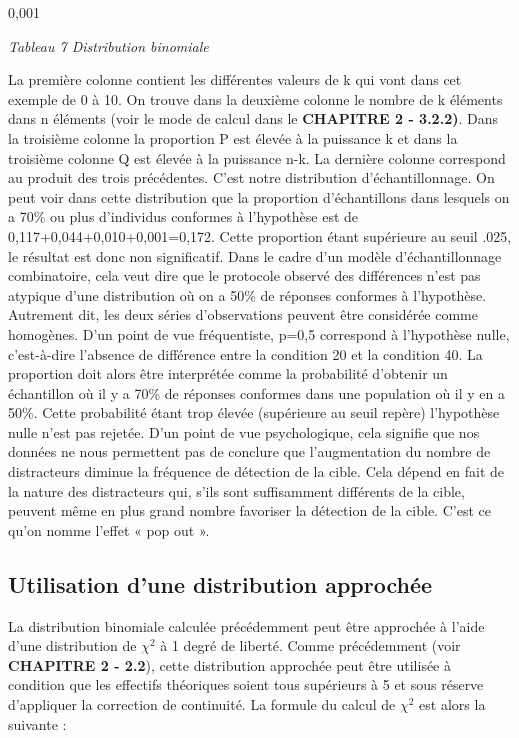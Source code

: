 \documentclass[]{book}
\theoremstyle{definition}
\theoremstyle{definition}
\theoremstyle{definition}
\theoremstyle{remark}
\begin{document}
0,001

\emph{Tableau 7 Distribution binomiale}

La première colonne contient les différentes valeurs de k qui vont dans
cet exemple de 0 à 10. On trouve dans la deuxième colonne le nombre de k
éléments dans n éléments (voir le mode de calcul dans le
\textbf{CHAPITRE 2 - 3.2.2)}. Dans la troisième colonne la proportion P
est élevée à la puissance k et dans la troisième colonne Q est élevée à
la puissance n-k. La dernière colonne correspond au produit des trois
précédentes. C'est notre distribution d'échantillonnage. On peut voir
dans cette distribution que la proportion d'échantillons dans lesquels
on a 70\% ou plus d'individus conformes à l'hypothèse est de
0,117+0,044+0,010+0,001=0,172. Cette proportion étant supérieure au
seuil .025, le résultat est donc non significatif. Dans le cadre d'un
modèle d'échantillonnage combinatoire, cela veut dire que le protocole
observé des différences n'est pas atypique d'une distribution où on a
50\% de réponses conformes à l'hypothèse. Autrement dit, les deux séries
d'observations peuvent être considérée comme homogènes. D'un point de
vue fréquentiste, p=0,5 correspond à l'hypothèse nulle, c'est-à-dire
l'absence de différence entre la condition 20 et la condition 40. La
proportion doit alors être interprétée comme la probabilité d'obtenir un
échantillon où il y a 70\% de réponses conformes dans une population où
il y en a 50\%. Cette probabilité étant trop élevée (supérieure au seuil
repère) l'hypothèse nulle n'est pas rejetée. D'un point de vue
psychologique, cela signifie que nos données ne nous permettent pas de
conclure que l'augmentation du nombre de distracteurs diminue la
fréquence de détection de la cible. Cela dépend en fait de la nature des
distracteurs qui, s'ils sont suffisamment différents de la cible,
peuvent même en plus grand nombre favoriser la détection de la cible.
C'est ce qu'on nomme l'effet « pop out ».

\hypertarget{utilisation-dune-distribution-approchee-2}{%
\subsection{Utilisation d'une distribution
approchée}\label{utilisation-dune-distribution-approchee-2}}

La distribution binomiale calculée précédemment peut être approchée à
l'aide d'une distribution de \(\chi ^{2}\) à 1 degré de liberté. Comme
précédemment (voir \textbf{CHAPITRE 2 - 2.2}), cette distribution
approchée peut être utilisée à condition que les effectifs théoriques
soient tous supérieurs à 5 et sous réserve d'appliquer la correction de
continuité. La formule du calcul de \(\chi ^{2}\) est alors la suivante
:
\end{document}
